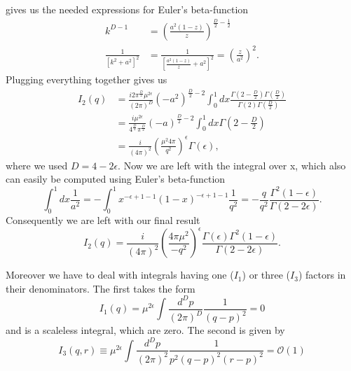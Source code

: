 	gives us the needed expressions for Euler's beta-function
	\begin{equation}
		\begin{split}
			k^{D-1} &= \left(\frac{a^2(1-z)}{z}\right)^{\frac{D}{2}-\frac{1}{2}} \\
			\frac{1}{[k^2+a^2]^2} &= \frac{1}{\left[\frac{a^2(1-z)}{z}+a^2\right]^2} = \left(\frac{z}{a^2}\right)^2.
		\end{split}
	\end{equation}
	Plugging everything together gives us 
	\begin{equation}
		\begin{split}
			I_2(q) &= \frac{i 2 \pi^{\frac{D}{2}} \mu^{2\epsilon}}{(2\pi)^D} (-a^2)^{\frac{D}{2}-2} \int_0^1 dx \frac{\Gamma(2-\frac{D}{2}) \Gamma(\frac{D}{2})}{\Gamma(2) \Gamma(\frac{D}{2})} \\
			&=  \frac{i \mu^{2\epsilon}}{4^{\frac{D}{2}} \pi^{\frac{D}{2}}}(-a)^{\frac{D}{2}-2} \int_0^1 dx \Gamma(2-\frac{D}{2})  \\
			&= \frac{i}{(4\pi)^2} \left(\frac{\mu^2 4 \pi}{q^2}\right)^\epsilon \Gamma(\epsilon),
		\end{split}
	\end{equation}
	where we used $D = 4-2\epsilon$. Now we are left with the integral over x, which also can easily be computed using Euler's beta-function
	\begin{equation}
		\int_0^1 dx \frac{1}{a^2} =  -\int_0^1 x^{-\epsilon + 1 - 1} (1-x)^{-\epsilon +1 -1} \frac{1}{q^2} = - \frac{q}{q^2} \frac{\Gamma^2(1-\epsilon)}{\Gamma(2-2\epsilon)}.
	\end{equation}
	Consequently we are left with our final result
	\begin{equation}
		I_2(q) = \frac{i}{(4\pi)^2} \left(\frac{4 \pi \mu^2}{- q^2}\right)^\epsilon \frac{\Gamma(\epsilon)\Gamma^2(1-\epsilon)}{\Gamma(2-2\epsilon)}.
	\end{equation}
	\par
	Moreover we have to deal with integrals having one ($I_1$) or three ($I_3$) factors in their denominators. The first takes the form 
	\begin{equation}	
		\label{eq:I1Integral}
		I_1(q) = \mu^{2\epsilon} \int \frac{d^Dp}{(2\pi)^D} \frac{1}{(q-p)^2} = 0 
	\end{equation}	
	and is a scaleless integral, which are zero. The second is given by
	\begin{equation}
		\label{eq:I3Integral}
		I_3(q, r) \equiv \mu^{2\epsilon} \int \frac{d^Dp}{(2\pi)^2} \frac{1}{p^2(q-p)^2(r-p)^2} = \mathcal{O}(1) 
	\end{equation}
